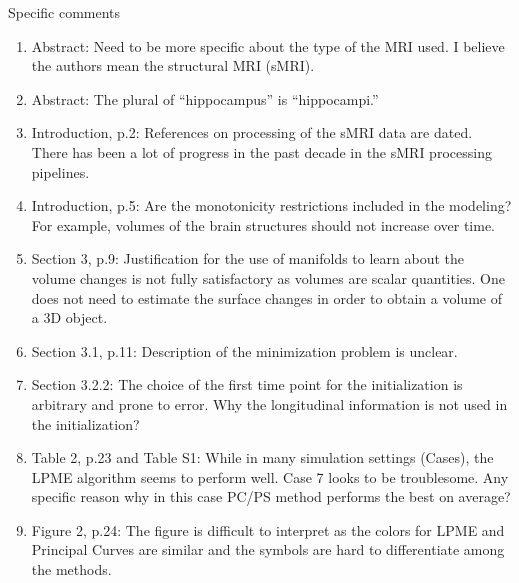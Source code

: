 \documentclass{article}
\theoremstyle{definition}
\begin{document}
Specific comments

\begin{enumerate}
\item Abstract:    Need to be more specific about the type of the MRI used. I believe the authors mean the structural MRI (sMRI).

\item Abstract:    The plural of “hippocampus” is “hippocampi.”

\item Introduction, p.2:  References on processing of the sMRI data are dated. There has been a lot of progress in the past decade in the sMRI processing pipelines.

\item Introduction, p.5: Are the monotonicity restrictions included in the modeling? For example, volumes of the brain structures should not increase over time.

\item Section 3, p.9:    Justification for the use of manifolds to learn about the volume changes is not fully satisfactory as volumes are scalar quantities. One does not need to estimate the surface changes in order to obtain a volume of a 3D object.

\item Section 3.1, p.11: Description of the minimization problem is unclear.

\item Section 3.2.2:    The choice of the first time point for the initialization is arbitrary and prone to error. Why the longitudinal information is not used in the initialization?

\item Table 2, p.23 and Table S1: While in many simulation settings (Cases), the LPME algorithm seems to perform well. Case 7 looks to be troublesome. Any specific reason why in this case PC/PS method performs the best on average?

\item Figure 2, p.24:    The figure is difficult to interpret as the colors for LPME and Principal Curves are similar and the symbols are hard to differentiate among the methods.

\end{enumerate}

%
%
\end{document}
